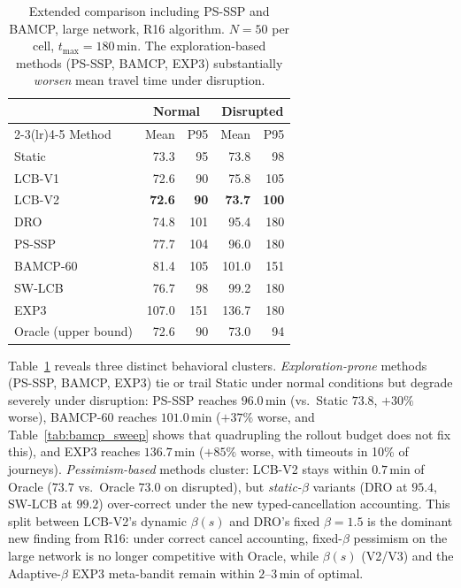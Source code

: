 \documentclass[11pt]{article}
\theoremstyle{definition}
\theoremstyle{remark}
\begin{document}
\begin{table}[t]
\centering
\caption{Extended comparison including PS-SSP and BAMCP, large
network, R16 algorithm. $N{=}50$ per cell, $t_{\max}{=}180$\,min.
The exploration-based methods (PS-SSP, BAMCP, EXP3) substantially
\emph{worsen} mean travel time under disruption.}
\label{tab:extended}
\begin{tabular}{l rr rr}
\toprule
& \multicolumn{2}{c}{Normal} & \multicolumn{2}{c}{Disrupted} \\
\cmidrule(lr){2-3}\cmidrule(lr){4-5}
Method & Mean & P95 & Mean & P95 \\
\midrule
Static       & 73.3 & 95 & 73.8 & 98 \\
LCB-V1       & 72.6 & 90 & 75.8 & 105 \\
LCB-V2       & \textbf{72.6} & \textbf{90} & \textbf{73.7} & \textbf{100} \\
DRO          & 74.8 & 101 & 95.4 & 180 \\
PS-SSP       & 77.7 & 104 & 96.0 & 180 \\
BAMCP-60     & 81.4 & 105 & 101.0 & 151 \\
\midrule
SW-LCB~\cite{garivier2011,luo2024}     & 76.7 & 98 & 99.2 & 180 \\
EXP3~\cite{kocak2014,chen2024}        & 107.0 & 151 & 136.7 & 180 \\
\midrule
Oracle (upper bound) & 72.6 & 90 & 73.0 & 94 \\
\bottomrule
\end{tabular}
\end{table}

Table~\ref{tab:extended} reveals three distinct behavioral clusters.
\emph{Exploration-prone} methods (PS-SSP, BAMCP, EXP3) tie or trail
Static under normal conditions but degrade severely under disruption:
PS-SSP reaches $96.0$\,min (vs.\ Static $73.8$, $+30\%$ worse),
BAMCP-60 reaches $101.0$\,min ($+37\%$ worse, and Table~\ref{tab:bamcp_sweep}
shows that quadrupling the rollout budget does not fix this), and
EXP3 reaches $136.7$\,min ($+85\%$ worse, with timeouts in 10\% of
journeys). \emph{Pessimism-based} methods cluster: LCB-V2 stays
within $0.7$\,min of Oracle ($73.7$ vs.\ Oracle $73.0$ on
disrupted), but \emph{static-$\beta$} variants (DRO at $95.4$,
SW-LCB at $99.2$) over-correct under the new typed-cancellation
accounting. This split between LCB-V2's dynamic $\beta(s)$ and
DRO's fixed $\beta=1.5$ is the dominant new finding from R16:
under correct cancel accounting, fixed-$\beta$ pessimism on the
large network is no longer competitive with Oracle, while
$\beta(s)$ (V2/V3) and the Adaptive-$\beta$ EXP3 meta-bandit
remain within $2$--$3$\,min of optimal.
\end{document}
